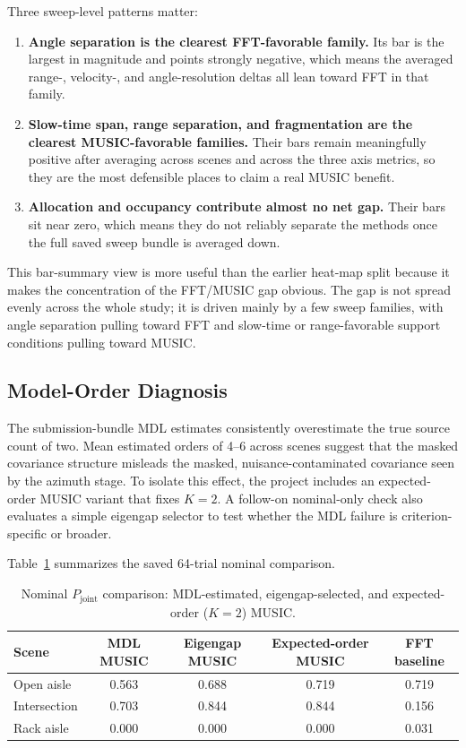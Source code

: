 \documentclass[11pt]{article}
\newcommand{\pjoint}{P_{\mathrm{joint}}}
\begin{document}
Three sweep-level patterns matter:
\begin{enumerate}
  \item \textbf{Angle separation is the clearest FFT-favorable family.} Its bar is the largest in magnitude and points strongly negative, which means the averaged range-, velocity-, and angle-resolution deltas all lean toward FFT in that family.
  \item \textbf{Slow-time span, range separation, and fragmentation are the clearest MUSIC-favorable families.} Their bars remain meaningfully positive after averaging across scenes and across the three axis metrics, so they are the most defensible places to claim a real MUSIC benefit.
  \item \textbf{Allocation and occupancy contribute almost no net gap.} Their bars sit near zero, which means they do not reliably separate the methods once the full saved sweep bundle is averaged down.
\end{enumerate}

This bar-summary view is more useful than the earlier heat-map split because it makes the concentration of the FFT/MUSIC gap obvious. The gap is not spread evenly across the whole study; it is driven mainly by a few sweep families, with angle separation pulling toward FFT and slow-time or range-favorable support conditions pulling toward MUSIC.

\subsection{Model-Order Diagnosis}

The submission-bundle MDL estimates consistently overestimate the true source count of two. Mean estimated orders of 4--6 across scenes suggest that the masked covariance structure misleads the masked, nuisance-contaminated covariance seen by the azimuth stage. To isolate this effect, the project includes an expected-order MUSIC variant that fixes $K=2$. A follow-on nominal-only check also evaluates a simple eigengap selector to test whether the MDL failure is criterion-specific or broader.

Table~\ref{tab:model-order} summarizes the saved 64-trial nominal comparison.

\begin{table}[H]
\centering
\small
\caption{Nominal $\pjoint$ comparison: MDL-estimated, eigengap-selected, and expected-order ($K=2$) MUSIC.}
\label{tab:model-order}
\begin{tabular}{lcccc}
\toprule
Scene & MDL MUSIC & Eigengap MUSIC & Expected-order MUSIC & FFT baseline \\
\midrule
Open aisle & 0.563 & 0.688 & 0.719 & 0.719 \\
Intersection & 0.703 & 0.844 & 0.844 & 0.156 \\
Rack aisle & 0.000 & 0.000 & 0.000 & 0.031 \\
\bottomrule
\end{tabular}
\end{table}
\end{document}
